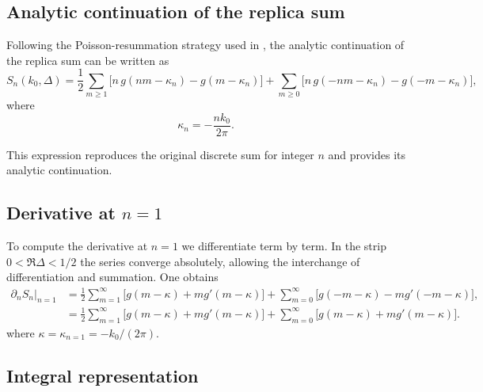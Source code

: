 \documentclass[11pt]{article}
\newcommand{\p}{\partial}
\newcommand{\nn}{\nonumber}
\begin{document}
\subsection{Analytic continuation of the replica sum}

Following the Poisson-resummation strategy used in
\cite{calabrese2011entanglement}, the analytic continuation of the replica sum can be
written as
\begin{equation}
S_n(k_0,\Delta)=
\frac{1}{2}\sum_{m\ge1}\big[n\,g(nm-\kappa_n)-g(m-\kappa_n)\big]
+
\sum_{m\ge0}\big[n\,g(-nm-\kappa_n)-g(-m-\kappa_n)\big],
\end{equation}
where
\begin{equation}
\kappa_n=-\frac{n k_0}{2\pi}.
\end{equation}

This expression reproduces the original discrete sum for integer $n$ and
provides its analytic continuation.

\subsection{\texorpdfstring{Derivative at $n=1$}{Derivative at n=1}}

To compute the derivative at $n=1$ we differentiate term by term.  In the
strip $0<\Re\Delta<1/2$ the series converge absolutely, allowing the
interchange of differentiation and summation.  One obtains
\begin{align}
\partial_n S_n\big|_{n=1}&=\frac{1}{2}
\sum_{m=1}^\infty\big[g(m-\kappa)+m g'(m-\kappa)\big]
+
\sum_{m=0}^\infty\big[g(-m-\kappa)-m g'(-m-\kappa)\big],  \nn \\
&= \frac{1}{2}
\sum_{m=1}^\infty\big[g(m-\kappa)+m g'(m-\kappa)\big] + \sum_{m=0}^\infty\big[g(m-\kappa)+m g'(m-\kappa)\big].
\end{align}
where $\kappa=\kappa_{n=1}=-k_0/(2\pi)$.

\subsection{Integral representation}
\end{document}
